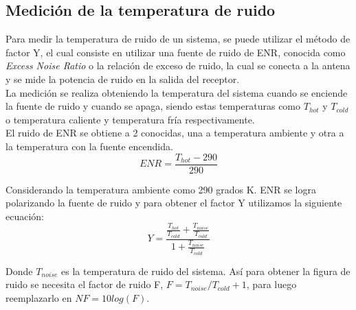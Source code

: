 \subsection{Medición de la temperatura de ruido}

Para medir la temperatura de ruido de un sistema, se puede utilizar el método de factor Y, el cual consiste en utilizar una fuente de ruido de ENR, conocida como \textit{Excess Noise Ratio} o la relación de exceso de ruido, la cual se conecta a la antena y se mide la potencia de ruido en la salida del receptor.\\

La medición se realiza obteniendo la temperatura del sistema cuando se enciende la fuente de ruido y cuando se apaga, siendo estas temperaturas como $T_{hot}$ y $T_{cold}$ o temperatura caliente y temperatura fría respectivamente.\\

El ruido de ENR se obtiene a 2  conocidas, una a temperatura ambiente y otra a la temperatura con la fuente encendida.\\

\begin{equation}
    ENR = \frac{T_{hot} - 290}{290}
\end{equation}

Considerando la temperatura ambiente como 290 grados K. ENR se logra polarizando la fuente de ruido y para obtener el factor Y utilizamos la siguiente ecuación:\\

\begin{equation}
    Y = \frac{\frac{T_{hot}}{T_{cold}} + \frac{T_{noise}}{T_{cold}}}{1 + \frac{T_{noise}}{T_{cold}}}
\end{equation}

Donde $T_{noise}$ es la temperatura de ruido del sistema. Así para obtener la figura de ruido se necesita el factor de ruido F, $F=T_{noise}/T_{cold} +1 $, para luego reemplazarlo en $NF = 10log(F)$\cite{analogNoiseFigure}.\\








